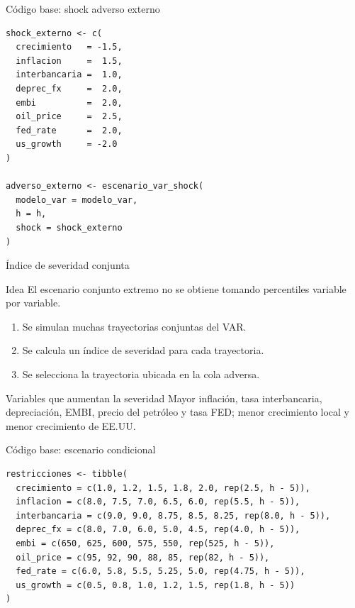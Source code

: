 \documentclass[10pt,aspectratio=169]{beamer}
\begin{document}
\begin{frame}[fragile]{Código base: shock adverso externo}

\small

\begin{verbatim}
shock_externo <- c(
  crecimiento   = -1.5,
  inflacion     =  1.5,
  interbancaria =  1.0,
  deprec_fx     =  2.0,
  embi          =  2.0,
  oil_price     =  2.5,
  fed_rate      =  2.0,
  us_growth     = -2.0
)

adverso_externo <- escenario_var_shock(
  modelo_var = modelo_var,
  h = h,
  shock = shock_externo
)
\end{verbatim}

\end{frame}

\begin{frame}{Índice de severidad conjunta}

\begin{block}{Idea}
El escenario conjunto extremo no se obtiene tomando percentiles variable por variable.
\end{block}

\begin{enumerate}
    \item Se simulan muchas trayectorias conjuntas del VAR.
    \item Se calcula un índice de severidad para cada trayectoria.
    \item Se selecciona la trayectoria ubicada en la cola adversa.
\end{enumerate}

\vspace{0.5em}

\begin{alertblock}{Variables que aumentan la severidad}
Mayor inflación, tasa interbancaria, depreciación, EMBI, precio del petróleo y tasa FED; menor crecimiento local y menor crecimiento de EE.UU.
\end{alertblock}

\end{frame}

\begin{frame}[fragile]{Código base: escenario condicional}

\small

\begin{verbatim}
restricciones <- tibble(
  crecimiento = c(1.0, 1.2, 1.5, 1.8, 2.0, rep(2.5, h - 5)),
  inflacion = c(8.0, 7.5, 7.0, 6.5, 6.0, rep(5.5, h - 5)),
  interbancaria = c(9.0, 9.0, 8.75, 8.5, 8.25, rep(8.0, h - 5)),
  deprec_fx = c(8.0, 7.0, 6.0, 5.0, 4.5, rep(4.0, h - 5)),
  embi = c(650, 625, 600, 575, 550, rep(525, h - 5)),
  oil_price = c(95, 92, 90, 88, 85, rep(82, h - 5)),
  fed_rate = c(6.0, 5.8, 5.5, 5.25, 5.0, rep(4.75, h - 5)),
  us_growth = c(0.5, 0.8, 1.0, 1.2, 1.5, rep(1.8, h - 5))
)
\end{verbatim}

\end{frame}
\end{document}
